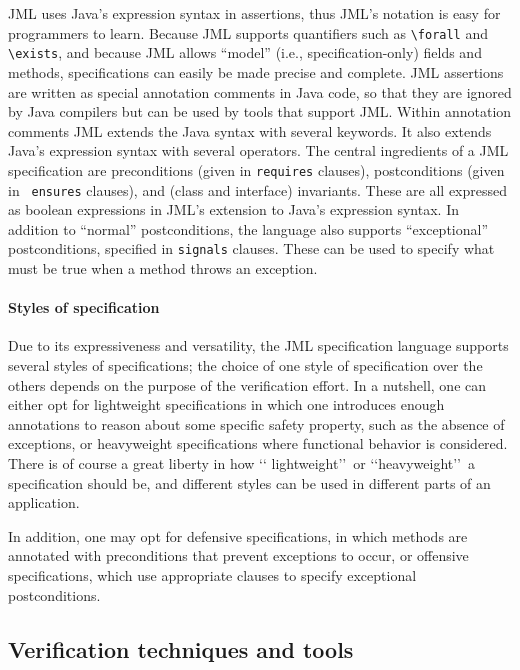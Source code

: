 JML uses Java's expression syntax in assertions,
thus JML's notation is easy for programmers to learn.  
Because JML supports quantifiers such as
\verb_\forall_ and \verb_\exists_, and because JML allows ``model''
(i.e., specification-only) fields and methods, specifications can
easily be made precise and complete.
JML assertions are written as special
annotation comments in Java code,
so that they are ignored by Java compilers but can be used
by tools that support JML\@.  Within annotation comments JML extends the
Java syntax with several keywords.  It also extends Java's expression syntax with several
operators.
The central ingredients of a JML specification are preconditions
(given in {\tt requires} clauses), postconditions (given in {\tt
  ensures} clauses), and (class and interface) invariants.  These are
all expressed as boolean expressions in JML's extension to Java's
expression syntax.
In addition to ``normal'' postconditions, the language also supports
``exceptional'' postconditions, specified in {\tt signals} clauses.
These can be used to specify what must be true when a method throws an
exception. 

\paragraph*{Styles of specification}
Due to its expressiveness and versatility, the JML specification
language supports several styles of specifications; the choice of one
style of specification over the others depends on the purpose of the
verification effort. In a nutshell, one can either opt for lightweight
specifications in which one introduces enough annotations to reason
about some specific safety property, such as the absence of
exceptions, or heavyweight specifications where functional behavior is
considered. There is of course a great liberty in how \lq\lq
lightweight\rq\rq\ or \lq\lq heavyweight\rq\rq\ a specification should
be, and different styles can be used in different parts of an
application.

In addition, one may opt for defensive specifications, in which methods
are annotated with preconditions that prevent exceptions to occur, or
offensive specifications, which use appropriate clauses to specify 
exceptional postconditions.

\subsection{Verification techniques and tools}

